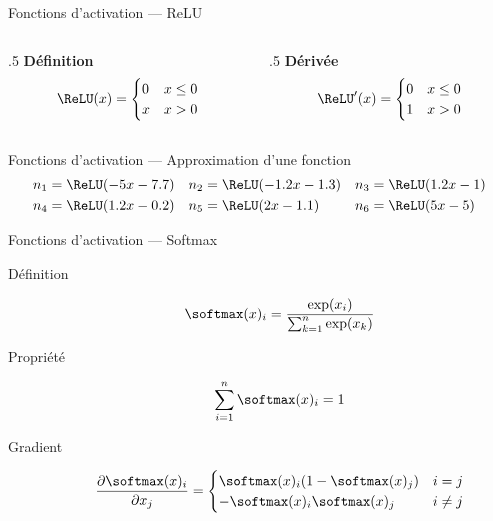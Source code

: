 \begin{frame}{Fonctions d'activation --- ReLU}
  \begin{center}
  \end{center}

  \begin{columns}
    \begin{column}{.5\tw}
      \centering
      \textbf{Définition}
      \[
        \ReLU(x) = \begin{cases}
                     0 & x \leq 0 \\
                     x & x > 0 \\
                   \end{cases}
      \]
      \end{column}
    \begin{column}{{.5\tw}}
      \centering
      \textbf{Dérivée}
      \[
        \ReLU'(x) =  \begin{cases}
                       0 & x \leq 0 \\
                       1 & x > 0\\
                     \end{cases}
      \]
    \end{column}
  \end{columns}
\end{frame}

\begin{frame}{Fonctions d'activation --- Approximation d'une fonction}
  \centering
  {\small
    \begin{align*}
      n_1 & = \ReLU(-5x - 7.7) & n_2 & = \ReLU(-1.2x - 1.3) & n_3 & = \ReLU(1.2x - 1) \\
      n_4 & = \ReLU(1.2x - 0.2) & n_5 & = \ReLU(2x - 1.1) & n_6 & = \ReLU(5x - 5) \\
    \end{align*}
  }
\end{frame}

\begin{frame}{Fonctions d'activation --- Softmax}
  \begin{description}
    \item[Définition] \[\softmax(x)_i = \frac{\exp(x_i)}{\sum_{k = 1}^n{\exp(x_k)}}\]
    \item[Propriété] \[\sum_{i = 1}^n{\softmax(x)_i} = 1\]
    \item[Gradient] \[
      \frac{\partial \softmax(x)_i}{\partial x_j} =
        \begin{cases}
          \softmax(x)_i(1 - \softmax(x)_j) & i = j \\
          -\softmax(x)_i\softmax(x)_j & i \neq j
        \end{cases}
      \]
  \end{description}
  
\end{frame}
